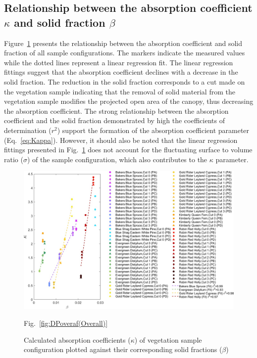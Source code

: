 \documentclass[12pt]{article}
\begin{document}
\subsection{Relationship between the absorption coefficient $\kappa$ and solid fraction $\beta$ }

Figure~\ref{fig:betavkappa} presents the relationship between the absorption coefficient and solid fraction of all sample configurations. The markers indicate the measured values while the dotted lines represent a linear regression fit. The linear regression fittings suggest that the absorption coefficient declines with a decrease in the solid fraction. The reduction in the solid fraction corresponds to a cut made on the vegetation sample indicating that the removal of solid material from the vegetation sample modifies the projected open area of the canopy, thus decreasing the absorption coefficient. The strong relationship between the absorption coefficient and the solid fraction demonstrated by high the coefficients of determination ($r^2$) support the formation of the absorption coefficient parameter (Eq.~\ref{eq:Kappa}). However, it should also be noted that the linear regression fittings presented in Fig.~\ref{fig:betavkappa} does not account for the fluctuating surface to volume ratio ($\sigma$) of the sample configuration, which also contributes to the $\kappa$ parameter. 

\begin{figure}
	\centering 	\includegraphics[width=1.1\linewidth]{Picture12.jpg}
	\caption{Calculated absorption coefficients ($\kappa$) of vegetation sample configuration plotted against their corresponding solid fractions ($\beta$) } Fig.~\ref{fig:DPoveraf(Overall)}
	\label{fig:betavkappa}
\end{figure}
\end{document}

